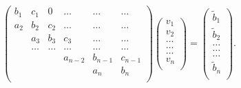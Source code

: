\documentclass{article}
\begin{document}
\begin{equation}
    \left(\begin{array}{cccccc}
                           b_1& c_1 & 0 &\dots   & \dots &\dots \\
                           a_2 & b_2 & c_2 &\dots &\dots &\dots \\
                           & a_3 & b_3 & c_3 & \dots & \dots \\
                           & \dots   & \dots &\dots   &\dots & \dots \\
                           &   &  &a_{n-2}  &b_{n-1}& c_{n-1} \\
                           &    &  &   &a_n & b_n \\
                      \end{array} \right)\left(\begin{array}{c}
                           v_1\\
                           v_2\\
                           \dots \\
                          \dots  \\
                          \dots \\
                           v_n\\
                      \end{array} \right)
  =\left(\begin{array}{c}
                           \tilde{b}_1\\
                           \tilde{b}_2\\
                           \dots \\
                           \dots \\
                          \dots \\
                           \tilde{b}_n\\
                      \end{array} \right).
\end{equation}
\end{document}
